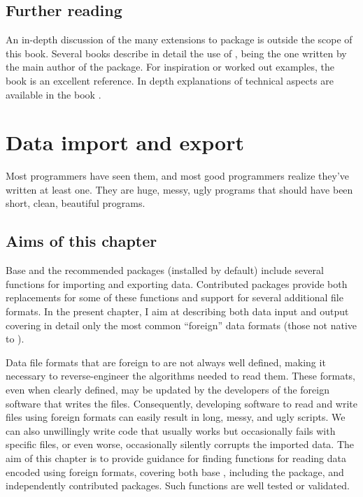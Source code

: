 \documentclass[krantz2]{krantz}\usepackage{knitr}
\begin{document}
\section{Further reading}
An in-depth discussion of the many extensions to package  is outside the scope of this book. Several books describe in detail the use of , being  \autocite{Wickham2016} the one written by the main author of the package. For inspiration or worked out examples, the book  \autocite{Chang2018} is an excellent reference. In depth explanations of technical aspects are available in the book  \autocite{Murrell2011}.









\chapter{Data import and export}\label{chap:R:data:io}\label{sec:data:io}

\begin{VF}
Most programmers have seen them, and most good programmers realize they've written at least one. They are huge, messy, ugly programs that should have been short, clean, beautiful programs.

\end{VF}



\section{Aims of this chapter}

Base \Rlang and the recommended packages (installed by default) include several functions for importing and exporting data. Contributed packages provide both replacements for some of these functions and support for several additional file formats. In the present chapter, I aim at describing both data input and output covering in detail only the most common ``foreign'' data formats (those not native to \Rlang).

Data file formats that are foreign to \Rlang are not always well defined, making it necessary to reverse-engineer the algorithms needed to read them. These formats, even when clearly defined, may be updated by the developers of the foreign software that writes the files. Consequently, developing software to read and write files using foreign formats can easily result in long, messy, and ugly \Rlang scripts. We can also unwillingly write code that usually works but occasionally fails with specific files, or even worse, occasionally silently corrupts the imported data. The aim of this chapter is to provide guidance for finding functions for reading data encoded using foreign formats, covering both base \Rlang, including the  package, and independently contributed packages. Such functions are well tested or validated.
\end{document}
